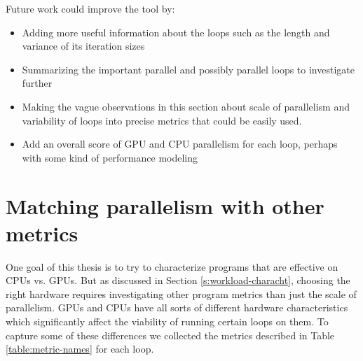 \documentclass[12pt,twoside]{reedthesis}
\begin{document}
		Future work could improve the tool by:
		
		\begin{itemize}
			\item Adding more useful information about the loops such as the length and variance of its iteration sizes
			\item Summarizing the important parallel and possibly parallel loops to investigate further
			\item Making the vague observations in this section about scale of parallelism and variability of loops into precise metrics that could be easily used. 
			\item  Add an overall score of GPU and CPU parallelism for each loop, perhaps with some kind of performance modeling
		\end{itemize} 
	
	\section{Matching parallelism with other metrics}
	
		One goal of this thesis is to try to characterize programs that are effective on CPUs vs. GPUs. But as discussed in Section \ref{s:workload-characht}, choosing the right hardware requires investigating other program metrics than just the scale of parallelism. GPUs and CPUs have all sorts of different hardware characteristics which significantly affect the viability of running certain loops on them. %
		To capture some of these differences we collected the metrics described in Table \ref{table:metric-names} for each loop.
		
\end{document}
